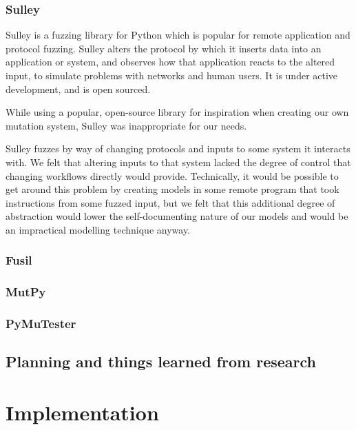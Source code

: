 \documentclass[a4paper]{l4proj}
\begin{document}
\begin{itemize}
\subsection{Sulley}
\label{fuzzing_sulley}
Sulley is a fuzzing library for Python which is popular for remote application and protocol fuzzing. Sulley alters the protocol by which it inserts data into an application or system, and observes how that application reacts to the altered input, to simulate problems with networks and human users. It is under active development, and is open sourced.\par
While using a popular, open-source library for inspiration when creating our own mutation system, Sulley was inappropriate for our needs.\par
Sulley fuzzes by way of changing protocols and inputs to some system it interacts with. We felt that altering inputs to that system lacked the degree of control that changing workflows directly would provide. Technically, it would be possible to get around this problem by creating models in some remote program that took instructions from some fuzzed input, but we felt that this additional degree of abstraction would lower the self-documenting nature of our models and would be an impractical modelling technique anyway.

\subsection{Fusil}
\label{fuzzing_fuzil}

\subsection{MutPy}
\label{fuzzing_mutpy}

\subsection{PyMuTester}
\label{fuzzing_pymutester}

\section{Planning and things learned from research}  %
\label{planning_head}

\chapter{Implementation}
\label{implementation_head}


\end{itemize}
\end{document}
